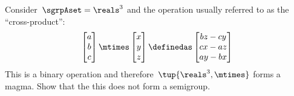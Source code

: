 \begin{exercise}
  \label{ex:cross_prod}
  Consider~$\sgrpAset=\reals^3$ and the operation usually referred to as the ``cross-product'':
  \begin{equation*}
    \begin{bmatrix}
      a\\ b\\ c
\end{bmatrix}\mtimes \begin{bmatrix} x\\ y \\ z\end{bmatrix}\definedas
\begin{bmatrix}
  bz-cy\\
  cx-az\\
  ay-bx
\end{bmatrix}
\end{equation*}
  This is a binary operation and therefore~$\tup{\reals^3,\mtimes}$ forms a magma. Show that the this does not form a semigroup.
\end{exercise}


